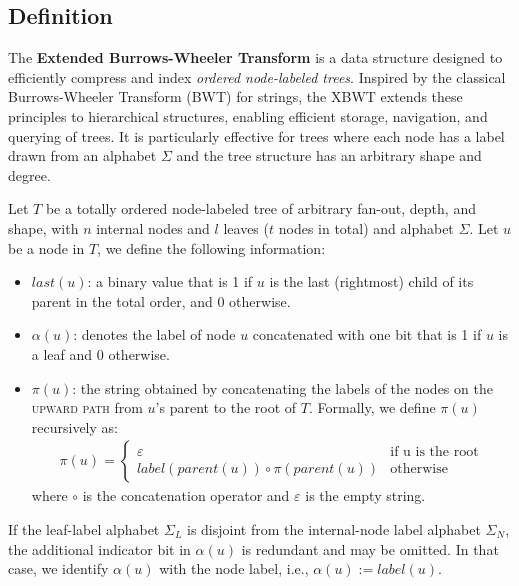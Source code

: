 \subsection{Definition}
The \textbf{Extended Burrows-Wheeler Transform} is a data structure designed to efficiently compress and index \emph{ordered node-labeled trees}. Inspired by the classical Burrows-Wheeler Transform (BWT) \cite{burrows1994block} for strings, the XBWT extends these principles to hierarchical structures, enabling efficient storage, navigation, and querying of trees. It is particularly effective for trees where each node has a label drawn from an alphabet $\Sigma$ and the tree structure has an arbitrary shape and degree.

\begin{definition}
    \label{def:node_informations}
    Let $T$ be a totally ordered node-labeled tree of arbitrary fan-out, depth, and shape, with $n$ internal nodes and $l$ leaves ($t$ nodes in total) and alphabet $\Sigma$. Let $u$ be a node in $T$, we define the following information:
    \begin{itemize}
        \item $last(u)$: a binary value that is 1 if $u$ is the last (rightmost) child of its parent in the total order, and 0 otherwise.
        \item $\alpha(u)$: denotes the label of node $u$ concatenated with one bit that is 1 if $u$ is a leaf and 0 otherwise.
        \item $\pi(u)$: the string obtained by concatenating the labels of the nodes on the \textsc{upward path} from $u$'s parent to the root of $T$. Formally, we define $\pi(u)$ recursively as:
        \begin{align*}
            \pi(u) = \begin{cases}
                \varepsilon & \text{if u is the root} \\
                label(parent(u)) \circ \pi(parent(u)) & \text{otherwise}
            \end{cases}
        \end{align*}
        where $\circ$ is the concatenation operator and $\varepsilon$ is the empty string.
    \end{itemize}
\end{definition}

If the leaf-label alphabet $\Sigma_L$ is disjoint from the internal-node label alphabet $\Sigma_N$, the additional indicator bit in $\alpha(u)$ is redundant and may be omitted. In that case, we identify $\alpha(u)$ with the node label, i.e., $\alpha(u) := label(u)$.

